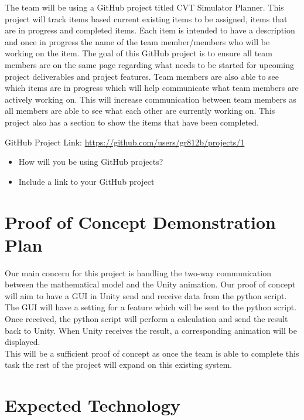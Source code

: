 \documentclass{article}
\begin{document}
The team will be using a GitHub project titled CVT Simulator Planner. 
This project will track items based current existing items to be assigned, items that are in progress and completed items. Each item is intended to have a description and once in progress the name of the team member/members who will be working on the item.
The goal of this GitHub project is to ensure all team members are on the same page regarding what needs to be started for upcoming project deliverables and project features. 
Team members are also able to see which items are in progress which will help communicate what team members are actively working on.
This will increase communication between team members as all members are able to see what each other are currently working on.
This project also has a section to show the items that have been completed. 

GitHub Project Link: \url{https://github.com/users/gr812b/projects/1}


\begin{itemize}
  \item How will you be using GitHub projects?
  \item Include a link to your GitHub project
\end{itemize}


\section{Proof of Concept Demonstration Plan}

Our main concern for this project is handling the two-way communication between the mathematical model and the Unity animation.
Our proof of concept will aim to have a GUI in Unity send and receive data from the python script.
The GUI will have a setting for a feature which will be sent to the python script. 
Once received, the python script will perform a calculation and send the result back to Unity.
When Unity receives the result, a corresponding animation will be displayed.
\\
\noindent
This will be a sufficient proof of concept as once the team is able to complete this task the rest of the project will expand on this existing system. 

\section{Expected Technology}
\end{document}
